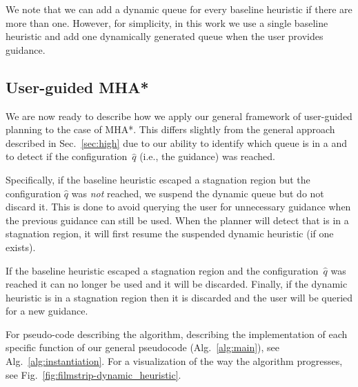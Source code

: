 \documentclass[conference]{IEEEtran}
\begin{document}
We note that we can add a dynamic queue for every baseline heuristic if there are more than one. However, for simplicity, in this work we use a single baseline heuristic and add one dynamically generated queue when the user provides guidance.

\subsection{User-guided MHA*}
\label{sec:instantiation}
We are now ready to describe how we apply our general framework of user-guided planning to the case of MHA*.
This differs slightly from the general approach described in Sec.~\ref{sec:high} due to our ability to identify which queue is in a \noindent  and to detect if the configuration~$\hat{q}$ (i.e., the guidance) was reached.

Specifically, if the baseline heuristic escaped a stagnation region but the configuration $\hat{q}$ was \emph{not} reached, we suspend the dynamic queue but do not discard it. 
This is done to avoid querying the user for unnecessary guidance when the previous guidance can still be used.
When the planner will detect that is in a stagnation region, it will first resume the suspended dynamic heuristic (if one exists).

If the baseline heuristic escaped a stagnation region and the configuration~$\hat{q}$ was  reached it can no longer be used and it will be discarded.
Finally, if the dynamic heuristic is in a stagnation region then it is discarded and the user will be queried for a new guidance. 

For pseudo-code describing the algorithm, describing the implementation of each specific function of our general pseudocode (Alg.~\ref{alg:main}), see Alg.~\ref{alg:instantiation}.
For a visualization of the way the algorithm progresses, see Fig.~\ref{fig:filmstrip-dynamic_heuristic}.
%
\end{document}
